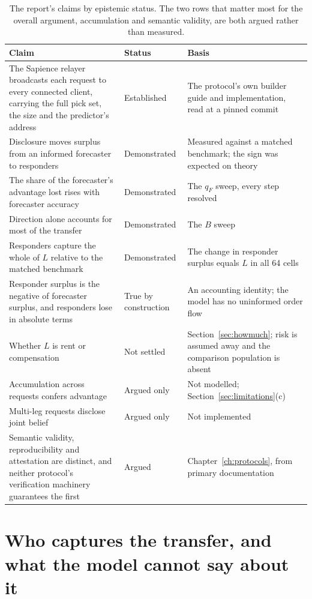 \begin{table}[htbp]
\centering
\small
\begin{tabularx}{\textwidth}{p{}p{}X}
\toprule
\textbf{Claim} & \textbf{Status} & \textbf{Basis} \\
\midrule
The Sapience relayer broadcasts each request to every connected client, carrying the full pick set, the size and the predictor's address & Established & The protocol's own builder guide and implementation, read at a pinned commit \\
Disclosure moves surplus from an informed forecaster to responders & Demonstrated & Measured against a matched benchmark; the sign was expected on theory \\
The share of the forecaster's advantage lost rises with forecaster accuracy & Demonstrated & The $q_F$ sweep, every step resolved \\
Direction alone accounts for most of the transfer & Demonstrated & The $B$ sweep \\
Responders capture the whole of $L$ relative to the matched benchmark & Demonstrated & The change in responder surplus equals $L$ in all 64 cells \\
Responder surplus is the negative of forecaster surplus, and responders lose in absolute terms & True by construction & An accounting identity; the model has no uninformed order flow \\
Whether $L$ is rent or compensation & Not settled & Section~\ref{sec:howmuch}; risk is assumed away and the comparison population is absent \\
Accumulation across requests confers advantage & Argued only & Not modelled; Section~\ref{sec:limitations}(c) \\
Multi-leg requests disclose joint belief & Argued only & Not implemented \\
Semantic validity, reproducibility and attestation are distinct, and neither protocol's verification machinery guarantees the first & Argued & Chapter~\ref{ch:protocols}, from primary documentation \\
\bottomrule
\end{tabularx}
\caption{The report's claims by epistemic status. The two rows that matter most for the
overall argument, accumulation and semantic validity, are both argued rather than measured.}
\label{tab:epistemic}
\end{table}

\section{Who captures the transfer, and what the model cannot say about it}
\label{sec:responders}

